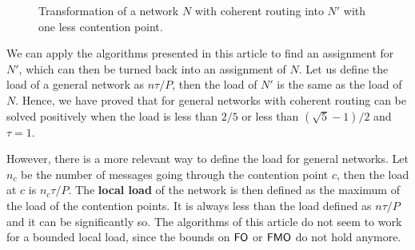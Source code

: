 \documentclass[pdflatex,sn-mathphys,iicol]{sn-jnl}%
\theoremstyle{thmstyleone}%
\theoremstyle{thmstyletwo}%
\theoremstyle{thmstylethree}%
\begin{document}
\begin{figure}
\begin{center}







 \caption{Transformation of a network $N$ with coherent routing into $N'$ with one less contention point.}

\label{fig:transformation}
\end{center}
\end{figure}


 We can apply the algorithms presented in this article to find an assignment for $N'$, which can then be turned back into an assignment of $N$. Let us define the load of a general network as $n\tau /P$, then the load of $N'$ is the same as the load of $N$. Hence, we have proved that \pma for general networks with coherent routing can be solved positively when the load is less than $2/5$ or less than $(\sqrt{5}-1)/2$ and $\tau = 1$. 

However, there is a more relevant way to define the load for general networks. Let $n_c$ be the number of messages going through the contention point $c$, then the load at $c$ is $n_c\tau/P$. The \textbf{local load} of the network is then defined as the maximum of the load of the contention points. It is always less than the load defined as $n\tau /P$ and it can be significantly so. The algorithms of this article do not seem to work for a bounded local load, since the bounds on $\textsf{FO}$ or $\textsf{FMO}$ do not hold anymore. %
\end{document}

